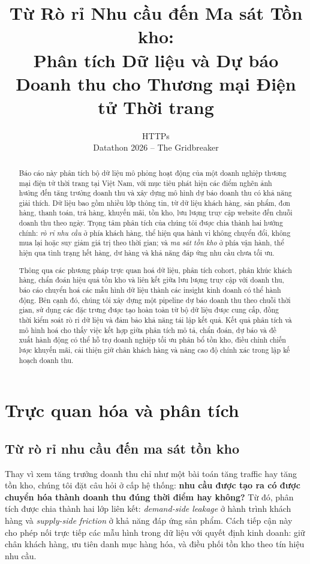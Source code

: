 \documentclass[10pt,a4paper]{article}
\title{
  Từ Rò rỉ Nhu cầu đến Ma sát Tồn kho: \\
  Phân tích Dữ liệu và Dự báo Doanh thu cho Thương mại Điện tử Thời trang
}
\author{
  HTTPs \\
  Datathon 2026 -- The Gridbreaker
}
\begin{document}
\maketitle
\begin{abstract}
  Báo cáo này phân tích bộ dữ liệu mô phỏng hoạt động của một doanh nghiệp thương mại điện tử thời trang tại Việt Nam, với mục tiêu phát hiện các điểm nghẽn ảnh hưởng đến tăng trưởng doanh thu và xây dựng mô hình dự báo doanh thu có khả năng giải thích. Dữ liệu bao gồm nhiều lớp thông tin, từ dữ liệu khách hàng, sản phẩm, đơn hàng, thanh toán, trả hàng, khuyến mãi, tồn kho, lưu lượng truy cập website đến chuỗi doanh thu theo ngày. Trọng tâm phân tích của chúng tôi được chia thành hai hướng chính: \textit{rò rỉ nhu cầu} ở phía khách hàng, thể hiện qua hành vi không chuyển đổi, không mua lại hoặc suy giảm giá trị theo thời gian; và \textit{ma sát tồn kho} ở phía vận hành, thể hiện qua tình trạng hết hàng, dư hàng và khả năng đáp ứng nhu cầu chưa tối ưu.

  Thông qua các phương pháp trực quan hoá dữ liệu, phân tích cohort, phân khúc khách hàng, chẩn đoán hiệu quả tồn kho và liên kết giữa lưu lượng truy cập với doanh thu, báo cáo chuyển hoá các mẫu hình dữ liệu thành các insight kinh doanh có thể hành động. Bên cạnh đó, chúng tôi xây dựng một pipeline dự báo doanh thu theo chuỗi thời gian, sử dụng các đặc trưng được tạo hoàn toàn từ bộ dữ liệu được cung cấp, đồng thời kiểm soát rò rỉ dữ liệu và đảm bảo khả năng tái lập kết quả. Kết quả phân tích và mô hình hoá cho thấy việc kết hợp giữa phân tích mô tả, chẩn đoán, dự báo và đề xuất hành động có thể hỗ trợ doanh nghiệp tối ưu phân bổ tồn kho, điều chỉnh chiến lược khuyến mãi, cải thiện giữ chân khách hàng và nâng cao độ chính xác trong lập kế hoạch doanh thu.
\end{abstract}
\newpage
\section{Trực quan hóa và phân tích}

\subsection{Từ rò rỉ nhu cầu đến ma sát tồn kho}

Thay vì xem tăng trưởng doanh thu chỉ như một bài toán tăng traffic hay tăng tồn kho, chúng tôi đặt câu hỏi ở cấp hệ thống: \textbf{nhu cầu được tạo ra có được chuyển hóa thành doanh thu đúng thời điểm hay không?} Từ đó, phân tích được chia thành hai lớp liên kết: \textit{demand-side leakage} ở hành trình khách hàng và \textit{supply-side friction} ở khả năng đáp ứng sản phẩm. Cách tiếp cận này cho phép nối trực tiếp các mẫu hình trong dữ liệu với quyết định kinh doanh: giữ chân khách hàng, ưu tiên danh mục hàng hóa, và điều phối tồn kho theo tín hiệu nhu cầu.
\end{document}
